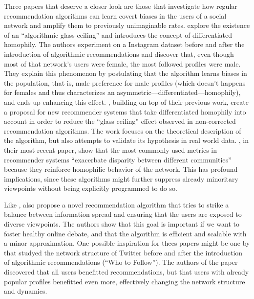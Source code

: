 Three papers that deserve a closer look are those that investigate how regular
recommendation algorithms can learn covert biases in the users of a social
network and amplify them to previously unimaginable rates.
\citet{stoica_algorithmic_2018} explore the existence of an ``algorithmic glass
ceiling'' and introduces the concept of differentiated homophily. The authors
experiment on a Instagram dataset before and after the introduction of
algorithmic recommendations and discover that, even though most of that
network's users were female, the most followed profiles were male. They explain
this phenomenon by postulating that the algorithm learns biases in the
population, that is, male preference for male profiles (which doesn't happens
for females and thus characterizes an asymmetric---differentiated---homophily), and
ends up enhancing this effect. \citet{stoica_hegemony_2019}, building on top of
their previous work, create a proposal for new recommender systems that take
differentiated homophily into account in order to reduce the ``glass ceiling''
effect observed in non-corrected recommendation algorithms. The work focuses on
the theoretical description of the algorithm, but also attempts to validate its
hypothesis in real world data. \citet{stoica_algorithmic_2020}, in their most
recent paper, show that the most commonly used metrics in recommender systems
``exacerbate disparity between different communities'' because they reinforce
homophilic behavior of the network. This has profound implications, since these
algorithms might further suppress already minoritary viewpoints without being
explicitly programmed to do so.

Like \citet{stoica_hegemony_2019}, \citet{matakos_maximizing_2020} also propose
a novel recommendation algorithm that tries to strike a balance between
information spread and ensuring that the users are exposed to diverse
viewpoints. The authors show that this goal is important if we want to foster
healthy online debate, and that the algorithm is efficient and scalable with a
minor approximation. One possible inspiration for thees papers might be one by
\citet{su_effect_2016} that studyed the network structure of Twitter before and
after the introduction of algorithmic recommendations (``Who to Follow''). The
authors of the paper discovered that all users benefitted recommendations, but
that users with already popular profiles benefitted even more, effectively
changing the network structure and dynamics.


